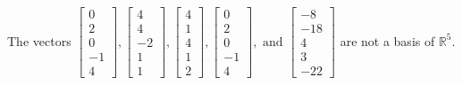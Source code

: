\begin{exercise}
\begin{exerciseStatement}
  \end{exerciseStatement}
  \begin{exerciseAnswer}
   The vectors \(\left[\begin{array}{r}
0 \\
2 \\
0 \\
-1 \\
4
\end{array}\right] , \left[\begin{array}{r}
4 \\
4 \\
-2 \\
1 \\
1
\end{array}\right] , \left[\begin{array}{r}
4 \\
1 \\
4 \\
1 \\
2
\end{array}\right] , \left[\begin{array}{r}
0 \\
2 \\
0 \\
-1 \\
4
\end{array}\right] , \text{ and } \left[\begin{array}{r}
-8 \\
-18 \\
4 \\
3 \\
-22
\end{array}\right]\) 
  	 are not  a basis of \(\mathbb{R}^5\).
  


  \end{exerciseAnswer}
\end{exercise}